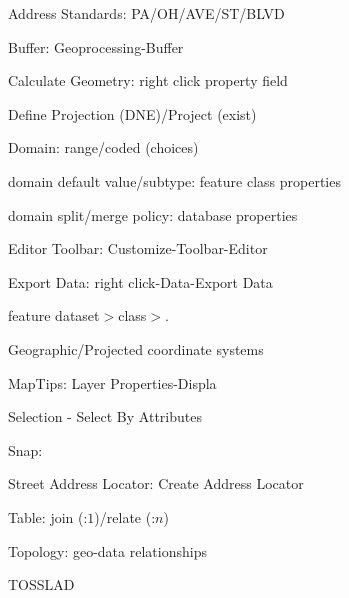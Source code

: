 \documentclass[12pt]{article}
\title{}
\author{}
\date{}
\begin{document}
\thispagestyle{empty}
\begin{multicols}{2}
Address Standards: PA/OH/AVE/ST/BLVD

Buffer: Geoprocessing-Buffer

Calculate Geometry: right click property field

Define Projection (DNE)/Project (exist)

Domain: range/coded (choices)

domain default value/subtype: feature class properties

domain split/merge policy: database properties

Editor Toolbar: Customize-Toolbar-Editor

Export Data: right click-Data-Export Data

feature dataset$>$class$>$.

Geographic/Projected coordinate systems

MapTips: Layer Properties-Displa

Selection - Select By Attributes

Snap: 

Street Address Locator: Create Address Locator

Table: join (:$1$)/relate (:$n$)

Topology: geo-data relationships

TOSSLAD


\end{multicols}
\end{document}
